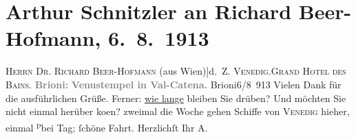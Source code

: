 

         
         \renewcommand{\erwaehntePersonen}{Personen: Richard Beer-Hofmann}
         \renewcommand{\erwaehnteOrte}{Orte: Brijuni, Grand Hotel des Bains, Lido, Tempel der Venus, Val Catena, Venedig, Wien}
         \renewcommand{\erwaehnteWerke}{}
               \section[Arthur Schnitzler an Richard Beer-Hofmann, 6. 8. 1913]{ Arthur Schnitzler an Richard Beer-Hofmann, 6. 8. 1913}\nopagebreak{}\rehead{ }\begin{ledgroupsized}[t]{13cm}\normalsize\beginnumbering \toendnotes[C]{\smallbreak\pagebreak[2]} 
\pstart{}{\pb}\textsc{Herrn Dr. Richard Beer-Hofmann} (aus Wien\oindex{Wien@\textbf{Wien}|pw}{[}){]}\pend{}\pstart{}d. Z. \textsc{Venedig.}\pend{}\pstart{}\textsc{Grand Hotel des Bains.}\pend{}{\bigskip}\pstart
           \noindent{}\centering{}{\pb}\textcolor{gray}{\textbf{Brioni:}}\pend
           \pstart
           \noindent{}\centering{}\textcolor{gray}{\textbf{Venustempel in Val-Catena.}}\pend
           \pstart
           \raggedleft{}{\pb}Brioni6/8 913\pend
           \pstart
           Vielen Dank für die ausführlichen Grüße. Ferner: \uline{wie
                  lange} bleiben Sie drüben? Und möchten Sie nicht einmal herüber ko{\geminationm}en? zweimal die Woche gehen Schiffe von \textsc{Venedig} hieher, {\pb}einmal \substVorne{}\textsuperscript{p}\substDazwischen{}b\substHinten{}ei Tag; ſchöne Fahrt.\pend
           \pstart Herzlichſt Ihr \spacefill\mbox{A.}\pend{}
         
         \endnumbering{}\end{ledgroupsized}  \newcommand{\dateiname}{L02147}\newcommand{\titel}{Arthur Schnitzler an Richard Beer-Hofmann, 6. 8. 1913}\newcommand{\editorInnen}{Martin Anton Müller und Gerd-Hermann Susen}
      